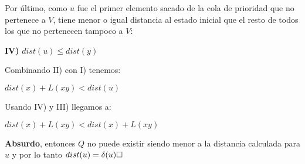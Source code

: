 Por último, como $u$ fue el primer elemento sacado de la cola de prioridad que no pertenece a $V$, tiene menor o igual distancia al estado inicial que el resto de todos los que no pertenecen tampoco a $V$:
\\
\begin{center}
\textbf{IV)} $dist(u) \le dist(y) $
\\
\end{center}
Combinando II) con I) tenemos:
\\
\begin{center}
$dist(x)+L(xy) < dist(u)$
\\
\end{center}
Usando IV) y III) llegamos a:
\\

\begin{center}
$dist(x)+L(xy) < dist(x) + L(xy)$
\\
\end{center}
\textbf{Absurdo}, entonces $Q$ no puede existir siendo menor a la distancia calculada para $u$ y por lo tanto $dist(u) = \delta(u) \QEDB$

